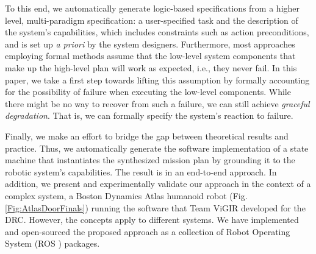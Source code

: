 To this end, we automatically generate logic-based specifications from a higher level, multi-paradigm specification: a user-specified task and the description of the system's capabilities, which includes constraints such as action preconditions, and is set up \emph{a priori} by the system designers.
Furthermore, most approaches employing formal methods assume that the low-level system components that make up the high-level plan will work as expected, i.e., they never fail.
In this paper, we take a first step towards lifting this assumption by formally accounting for the possibility of failure when executing the low-level components.
While there might be no way to recover from such a failure, we can still achieve \emph{graceful degradation}.
That is, we can formally specify the system's reaction to failure.

Finally, we make an effort to bridge the gap between theoretical results and practice. 
Thus, we automatically generate the software implementation of a state machine that instantiates the synthesized mission plan by grounding it to the robotic system's capabilities.
The result is in an end-to-end approach.
In addition, we present and experimentally validate our approach in the context of a complex system, a Boston Dynamics Atlas humanoid robot (Fig. \ref{Fig:AtlasDoorFinals}) running the software that Team ViGIR developed for the DRC.
However, the concepts apply to different systems.
We have implemented and open-sourced the proposed approach as a collection of Robot Operating System (ROS \cite{ROS}) packages.


